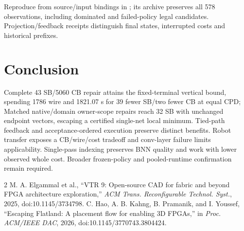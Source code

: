 \documentclass[conference,10pt]{IEEEtran}
\begin{document}
Reproduce from source/input bindings in ; its archive preserves all 578 observations, including dominated and failed-policy legal candidates. Projection/feedback receipts distinguish final states, interrupted costs and historical prefixes.

\section{Conclusion}
Complete 43 SB/5060 CB repair attains the fixed-terminal vertical bound, spending 1786 wire and 1821.07 s for 39 fewer SB/two fewer CB at equal CPD; Matched native/domain owner-scope repairs reach 32 SB with unchanged endpoint vectors, escaping a certified single-net local minimum. Tied-path feedback and acceptance-ordered execution preserve distinct benefits. Robot transfer exposes a CB/wire/cost tradeoff and conv-layer failure limits applicability. Single-pass indexing preserves BNN quality and work with lower observed whole cost. Broader frozen-policy and pooled-runtime confirmation remain required.

\begin{thebibliography}{2}
 M. A. Elgammal et al., ``VTR 9: Open-source CAD for fabric and beyond FPGA architecture exploration,'' \emph{ACM Trans. Reconfigurable Technol. Syst.}, 2025, doi:10.1145/3734798.
 C. Hao, A. B. Kahng, B. Pramanik, and I. Youssef, ``Escaping Flatland: A placement flow for enabling 3D FPGAs,'' in \emph{Proc. ACM/IEEE DAC}, 2026, doi:10.1145/3770743.3804424.
\end{thebibliography}
\end{document}
